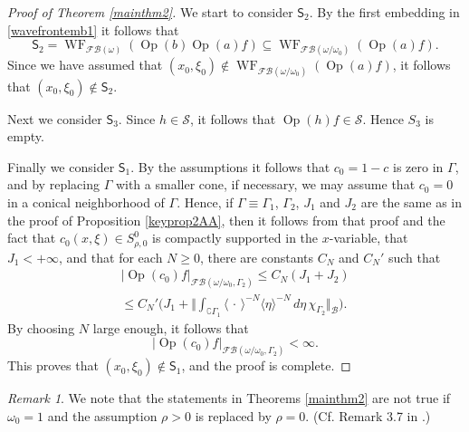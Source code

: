 \documentclass[12pt,a4paper,reqno]{amsart}
\numberwithin{equation}{section}
\numberwithin{thm}{section}
\theoremstyle{definition}
\theoremstyle{remark}
\newtheorem{rem}[thm]{Remark}
\begin{document}
\begin{proof}[Proof of Theorem \ref{mainthm2}]
\par

We start to consider $\mathsf S_2$. By the first embedding in
\eqref{wavefrontemb1} it follows that
$$
\mathsf S_2 = {\operatorname{WF}} _{{\mathscr F\! \mathscr B} (\omega )}({\operatorname{Op}} (b){\operatorname{Op}} (a)f)
\subseteq {\operatorname{WF}}  _{{\mathscr F\! \mathscr B} (\omega /\omega _0)}({\operatorname{Op}} (a)f).
$$
Since we have assumed that $(x_0,\xi _0)\notin {\operatorname{WF}} _{{\mathscr F\! \mathscr B} (\omega /\omega _0)}({\operatorname{Op}}
(a)f)$, it follows that $(x_0,\xi _0)\notin \mathsf S_2$.

\par

Next we consider $\mathsf S_3$. Since $h\in \mathscr S$, it follows that ${\operatorname{Op}} (h)f\in \mathscr S$. Hence $S_3$ is empty.

\par

Finally we consider $\mathsf S_1$. By the assumptions it follows
that $c_0=1-c$ is zero in $\Gamma$, and by replacing $ \Gamma $ with a
smaller cone, if necessary, we may assume that $ c_0 = 0 $ in a
conical neighborhood of $ \Gamma$. Hence, if $\Gamma \equiv \Gamma _1$, $\Gamma _2$, $J_1$ and $J_2$ are the
same as in the
proof of Proposition \ref{keyprop2AA}, then it follows from that proof
and the fact that $c_0(x,\xi )\in S^0_{\rho ,0}$ is compactly
supported in the $x$-variable, that $J_1<+\infty$, and that for each $N\ge
0$, there are constants $C_N$ and $C_N'$ such that
\begin{multline}\label{estagain4}
| {\operatorname{Op}} (c_0)f |_{{\mathscr F\! \mathscr B} (\omega /\omega _0,\Gamma _2)} \le
C_N (J_1+J_2)
\\[1ex]
\le C_N' \Big (J_1+ \Big \Vert \int _{\complement
\Gamma _1}{\langle {\, \cdot \, }\rangle} ^{-N}{\langle \eta\rangle} ^{-N}\, d\eta \, \chi _{\Gamma _2} 
\Big \Vert _{\mathscr B} \Big ).
\end{multline}
By choosing $N$ large enough, it follows that
$$
|{\operatorname{Op}} (c_0)f |_{{\mathscr F\! \mathscr B}(\omega/\omega _0,\Gamma _2)}
< \infty .
$$
This proves that $(x_0,\xi _0)\notin \mathsf S_1$, and
the proof is complete.
\end{proof}

\par

\begin{rem}\label{rho0}
We note that the statements in Theorems \ref{mainthm2} are not true if $\omega _0=1$ and the assumption $\rho >0$ is replaced by
$\rho =0$. (Cf. Remark 3.7 in \cite{PTT1}.)
\end{rem}
\end{document}
